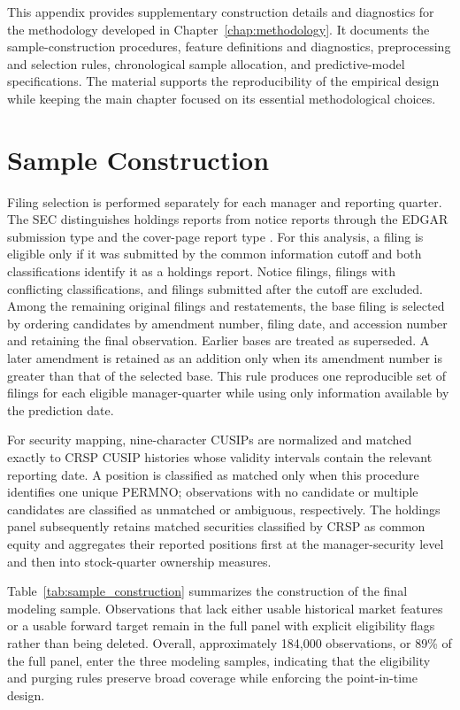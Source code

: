 This appendix provides supplementary construction details and diagnostics for the methodology developed in Chapter~\ref{chap:methodology}. It documents the sample-construction procedures, feature definitions and diagnostics, preprocessing and selection rules, chronological sample allocation, and predictive-model specifications. The material supports the reproducibility of the empirical design while keeping the main chapter focused on its essential methodological choices.

\section{Sample Construction}
\label{app:sample_construction}

Filing selection is performed separately for each manager and reporting quarter. The SEC distinguishes holdings reports from notice reports through the EDGAR submission type and the cover-page report type \parencite[FAQs 20 and 33]{sec2023form13f}. For this analysis, a filing is eligible only if it was submitted by the common information cutoff and both classifications identify it as a holdings report. Notice filings, filings with conflicting classifications, and filings submitted after the cutoff are excluded. Among the remaining original filings and restatements, the base filing is selected by ordering candidates by amendment number, filing date, and accession number and retaining the final observation. Earlier bases are treated as superseded. A later amendment is retained as an addition only when its amendment number is greater than that of the selected base. This rule produces one reproducible set of filings for each eligible manager-quarter while using only information available by the prediction date.

For security mapping, nine-character CUSIPs are normalized and matched exactly to CRSP CUSIP histories whose validity intervals contain the relevant reporting date. A position is classified as matched only when this procedure identifies one unique PERMNO; observations with no candidate or multiple candidates are classified as unmatched or ambiguous, respectively. The holdings panel subsequently retains matched securities classified by CRSP as common equity and aggregates their reported positions first at the manager-security level and then into stock-quarter ownership measures.

Table~\ref{tab:sample_construction} summarizes the construction of the final modeling sample. Observations that lack either usable historical market features or a usable forward target remain in the full panel with explicit eligibility flags rather than being deleted. Overall, approximately 184,000 observations, or 89\% of the full panel, enter the three modeling samples, indicating that the eligibility and purging rules preserve broad coverage while enforcing the point-in-time design.

